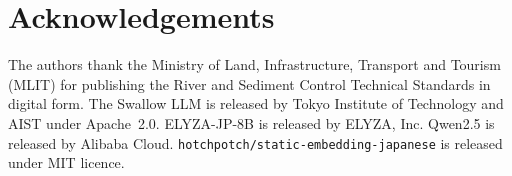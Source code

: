 \documentclass[twocolumn]{article}
\begin{document}
\section*{Acknowledgements}

The authors thank the Ministry of Land, Infrastructure, Transport and Tourism
(MLIT) for publishing the River and Sediment Control Technical Standards in
digital form.
The Swallow LLM is released by Tokyo Institute of Technology and AIST under
Apache~2.0.
ELYZA-JP-8B is released by ELYZA, Inc.
Qwen2.5 is released by Alibaba Cloud.
\texttt{hotchpotch/static-embedding-japanese} is released under MIT licence.



\end{document}
